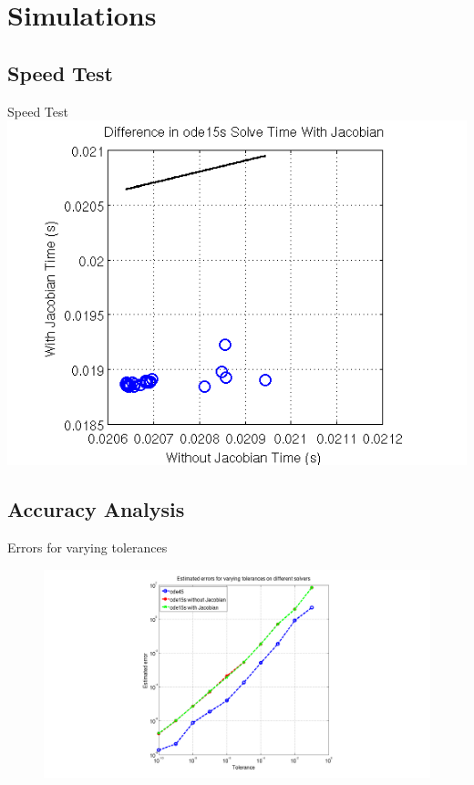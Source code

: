 \documentclass{beamer}
\begin{document}
\section{Simulations}

\subsection{Speed Test}
\begin{frame}{Speed Test}
\centering
\includegraphics[scale=0.6]{jacnojac}
\end{frame}

\subsection{Accuracy Analysis}
\begin{frame}{Errors for varying tolerances} 
\centering
\begin{figure}[ht!]
\centering
\includegraphics[scale=0.25]{errorvtol} 
\end{figure}
\end{frame}
\end{document}
